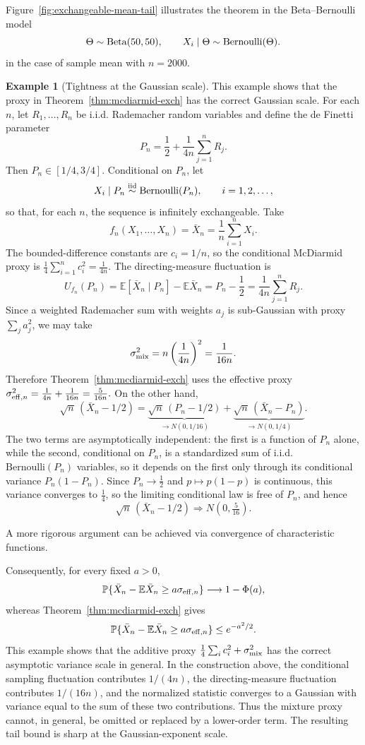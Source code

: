 \documentclass[11pt]{article}
\newcommand{\E}{\mathbb{E}}
\newcommand{\Pbb}{\mathbb{P}}
\theoremstyle{definition}
\newtheorem{example}[theorem]{Example}
\theoremstyle{remark}
\begin{document}
Figure~\ref{fig:exchangeable-mean-tail} illustrates the theorem in the Beta--Bernoulli model
\[
    \Theta\sim{\rm Beta}(50,50),
    \qquad
    X_i\mid\Theta\sim{\rm Bernoulli}(\Theta).
\]
in the case of sample mean with $n=2000$.

\begin{example}[Tightness at the Gaussian scale]\label{ex:mixture-tight}
This example shows that the proxy in Theorem~\ref{thm:mcdiarmid-exch} has the correct Gaussian scale.  For each $n$, let $R_1,\ldots,R_n$ be i.i.d. Rademacher random variables and define the de Finetti parameter
\[
    P_n
    =
    \frac12+\frac{1}{4n}\sum_{j=1}^n R_j .
\]
Then $P_n\in[1/4,3/4]$.  Conditional on $P_n$, let
\[
    X_i\mid P_n \stackrel{\mathrm{iid}}{\sim} {\rm Bernoulli}(P_n),
    \qquad i=1,2,\ldots,
\]
so that, for each $n$, the sequence is infinitely exchangeable.  Take
\[
    f_n(X_1,\ldots,X_n)=\bar X_n=\frac1n\sum_{i=1}^n X_i .
\]
The bounded-difference constants are $c_i=1/n$, so the conditional McDiarmid proxy is $\frac14\sum_{i=1}^n c_i^2=\frac{1}{4n}$.
The directing-measure fluctuation is
\[
    U_{f_n}(P_n)
    =
    \E[\bar X_n\mid P_n]-\E\bar X_n
    =
    P_n-\frac12
    =
    \frac{1}{4n}\sum_{j=1}^n R_j .
\]
Since a weighted Rademacher sum with weights $a_j$ is sub-Gaussian with proxy $\sum_j a_j^2$, we may take
\[
    \sigma_{\rm mix}^2
    =
    n\left(\frac{1}{4n}\right)^2
    =
    \frac{1}{16n}.
\]
Therefore Theorem~\ref{thm:mcdiarmid-exch} uses the effective proxy $\sigma_{{\rm eff},n}^2
    =
    \frac{1}{4n}+\frac{1}{16n}
    =
    \frac{5}{16n}.$
On the other hand,
\[
    \sqrt n\, (\bar X_n-1/2)
    =
    \underbrace{\sqrt n\,(P_n-1/2)}_{\to N(0,1/16)}
    +
    \underbrace{\sqrt n\,(\bar X_n-P_n)}_{\to N(0,1/4)} .
\]
The two terms are asymptotically independent: the first is a function of $P_n$
alone, while the second, conditional on $P_n$, is a standardized sum of i.i.d.\
$\mathrm{Bernoulli}(P_n)$ variables, so it depends on the first only through its
conditional variance $P_n(1-P_n)$.  Since $P_n\to\frac12$ and $p\mapsto p(1-p)$
is continuous, this variance converges to $\tfrac14$, so the limiting conditional
law is free of $P_n$, and hence
\[
    \sqrt n\, (\bar X_n-1/2)\Rightarrow N\!\left(0,\tfrac5{16}\right).
\]

A more rigorous argument can be achieved via convergence of characteristic functions.

Consequently, for every fixed $a>0$,
\[
    \Pbb\{\bar X_n-\E\bar X_n\ge a\sigma_{{\rm eff},n}\}
    \longrightarrow
    1-\Phi(a),
\]
whereas Theorem~\ref{thm:mcdiarmid-exch} gives
\[
    \Pbb\{\bar X_n-\E\bar X_n\ge a\sigma_{{\rm eff},n}\}
    \le
    e^{-a^2/2}.
\]
This example shows that the additive proxy $\frac14\sum_i c_i^2+\sigma_{\rm mix}^2$ has the correct asymptotic variance scale in general. In the construction above, the conditional sampling fluctuation contributes $1/(4n)$, the directing-measure
fluctuation contributes $1/(16n)$, and the normalized statistic converges to
a Gaussian with variance equal to the sum of these two contributions. Thus the
mixture proxy cannot, in general, be omitted or replaced by a lower-order term. The resulting tail bound is sharp at the Gaussian-exponent scale.
\end{example}
\end{document}

